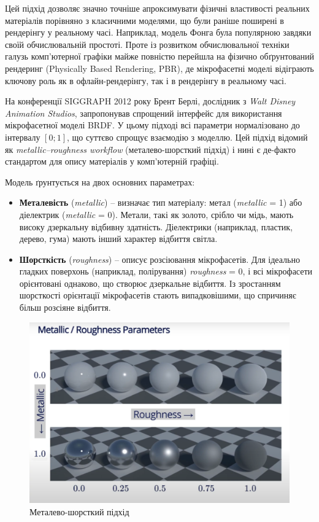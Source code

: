 \par
Цей підхід дозволяє значно точніше апроксимувати фізичні властивості реальних матеріалів порівняно з класичними моделями, що були раніше поширені в
 рендерінгу у реальному часі. Наприклад, модель Фонга була популярною завдяки своїй обчислювальній простоті. Проте із розвитком обчислювальної техніки 
 галузь комп'ютерної графіки майже повністю перейшла на фізично обґрунтований рендеринг (Physically Based Rendering, PBR), де мікрофасетні моделі відіграють
  ключову роль як в офлайн-рендерінгу, так і в рендерінгу в реальному часі.

\par
На конференції SIGGRAPH 2012 року \cite{Ch6} Брент Берлі, дослідник з \textit{Walt Disney Animation Studios}, запропонував спрощений інтерфейс для
 використання мікрофасетної моделі BRDF. У цьому підході всі параметри нормалізовано до інтервалу $[0;1]$, що суттєво спрощує взаємодію з моделлю. 
Цей підхід відомий як \textit{metallic–roughness workflow} (металево-шорсткий підхід) і нині є де-факто стандартом для опису матеріалів у комп’ютерній графіці.

Модель ґрунтується на двох основних параметрах:
\begin{itemize}
    \item \textbf{Металевість} (\textit{metallic}) -- визначає тип матеріалу: метал (\textit{metallic} = 1) або діелектрик (\textit{metallic} = 0). Метали, 
    такі як золото, срібло чи мідь, мають високу дзеркальну відбивну здатність. Діелектрики (наприклад, пластик, дерево, гума) мають інший характер відбиття світла.
    
    \item \textbf{Шорсткість} (\textit{roughness}) -- описує розсіювання мікрофасетів. Для ідеально гладких поверхонь (наприклад, полірування) \textit{roughness} = 0,
     і всі мікрофасети орієнтовані однаково, що створює дзеркальне відбиття. Із зростанням шорсткості орієнтації мікрофасетів стають випадковішими, що спричиняє 
     більш розсіяне відбиття.
\end{itemize}

\begin{figure}[h]
  \centering
  \includegraphics[scale=0.4]{Pictures/rough-metal.png}
  \caption{Металево-шорсткий підхід}
  \label{fig:RM}
\end{figure}

